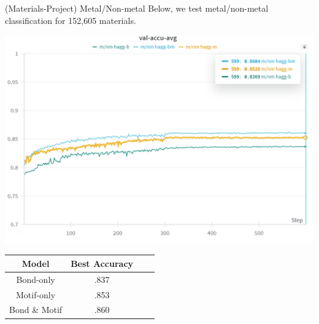 \documentclass[11pt]{beamer}
\begin{document}
\begin{frame}{(Materials-Project) Metal/Non-metal}
Below, we test metal/non-metal classification for 152,605 materials.
\begin{center}
\includegraphics[scale=0.4]{metal_nonmetal.png}

\medskip



\begin{tabular}{c|ccc}
Model & Best Accuracy  \\
\hline
Bond-only & .837\\
Motif-only & .853\\
Bond \& Motif & .860\\
\end{tabular}
\end{center}
\end{frame}
\end{document}
